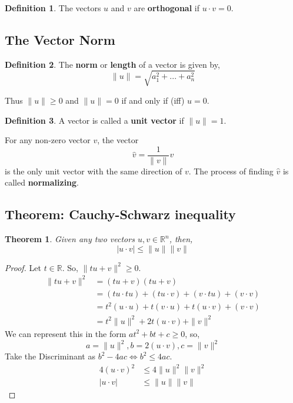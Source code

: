 \documentclass{report}
\newtheorem{_thm}{Theorem}
\theoremstyle{definition}
\newtheorem{_def}{Definition}
\begin{document}
\begin{_def}
The vectors \(u\) and \(v\) are \textbf{orthogonal} if \(u\cdot v=0\).
\end{_def}

\subsection{The Vector Norm}

\begin{_def}
The \textbf{norm} or \textbf{length} of a vector is given by,
\[\|u\|=\sqrt{a^2_1+...+a^2_n}\]
\end{_def}

Thus \(\|u\|\geq 0\) and \(\|u\|=0\) if and only if (iff) \(u=0\).

\begin{_def}
A vector is called a \textbf{unit vector} if \(\|u\|=1\).
\end{_def}

For any non-zero vector \(v\), the vector 
\[\hat{v}=\frac{1}{\|v\|} v\]
is the only unit vector with the same direction of \(v\).
The process of finding \(\hat{v}\) is called \textbf{normalizing}.

\subsection{Theorem: Cauchy-Schwarz inequality}

\begin{_thm}
Given any two vectors \(u,v\in \mathbb{R}^n\), then,
\[|u\cdot v|\leq \|u\|\|v\|\]
\end{_thm}

\begin{proof}
Let \(t\in \mathbb{R}\). So, \(\|tu+v\|^2\geq 0\).
\begin{align*}
\|tu+v\|^2 &= (tu+v)(tu+v) \\
&= (tu\cdot tu)+(tu\cdot v)+(v\cdot tu)+(v\cdot v) \\
&= t^2(u\cdot u)+t(v\cdot u)+t(u\cdot v)+(v\cdot v) \\
&= t^2\|u\|^2+2t(u\cdot v)+\|v\|^2
\end{align*}
We can represent this in the form \(at^2+bt+c\geq 0\), so,
\[a=\|u\|^2, b=2(u\cdot v), c=\|v\|^2\]
Take the Discriminant as \(b^2-4ac\iff b^2\leq 4ac\).
\begin{align*}
4(u\cdot v)^2 &\leq 4\|u\|^2\|v\|^2 \\
|u\cdot v| &\leq \|u\|\|v\|
\end{align*}
\end{proof}
\end{document}
